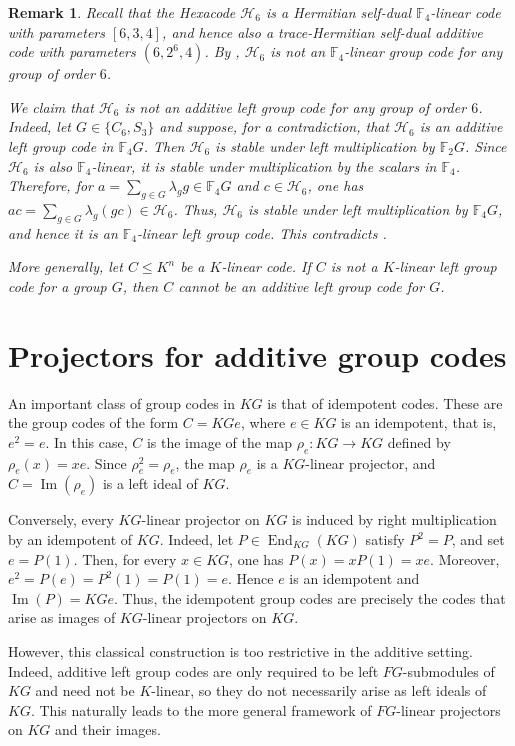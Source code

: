 \documentclass[11pt]{article}
\newtheorem{remark}[theorem]{Remark}
\begin{document}
\begin{remark}\label{hexa-code}
Recall that the Hexacode $\mathcal{H}_6$ is a Hermitian self-dual
$\mathbb{F}_4$-linear code with parameters $[6,3,4]$, and hence also a
trace-Hermitian self-dual additive code with parameters $(6,2^6,4)$. By
\cite{BBW24}, $\mathcal{H}_6$ is not an $\mathbb{F}_4$-linear group code for
any group of order $6$.

We claim that $\mathcal{H}_6$ is not an additive left group code for any
group of order $6$. Indeed, let $G\in\{C_6,S_3\}$ and suppose, for a
contradiction, that $\mathcal{H}_6$ is an additive left group code in
$\mathbb{F}_4G$. Then $\mathcal{H}_6$ is stable under left multiplication by
$\mathbb{F}_2G$. Since $\mathcal{H}_6$ is also $\mathbb{F}_4$-linear, it is
stable under multiplication by the scalars in $\mathbb{F}_4$. Therefore, for
$a=\sum_{g\in G}\lambda_g g\in\mathbb{F}_4G$ and
$c\in\mathcal{H}_6$, one has
$ac=\sum_{g\in G}\lambda_g(gc)\in\mathcal{H}_6$. Thus,
$\mathcal{H}_6$ is stable under left multiplication by $\mathbb{F}_4G$, and
hence it is an $\mathbb{F}_4$-linear left group code. This contradicts
\cite{BBW24}.

More generally, let $C\leq K^n$ be a $K$-linear code. If $C$ is not a
$K$-linear left group code for a group $G$, then $C$ cannot be an additive
left group code for $G$.
\end{remark}
\section{Projectors for additive group codes}
An important class of group codes in $KG$ is that of idempotent codes. These
are the group codes of the form $C=KGe$, where $e\in KG$ is an idempotent,
that is, $e^2=e$. In this case, $C$ is the image of the map
$\rho_e:KG\longrightarrow KG$ defined by $\rho_e(x)=xe$. Since
$\rho_e^2=\rho_e$, the map $\rho_e$ is a $KG$-linear projector, and
$C=\operatorname{Im}(\rho_e)$ is a left ideal of $KG$.

Conversely, every $KG$-linear projector on $KG$ is induced by right
multiplication by an idempotent of $KG$. Indeed, let
$P\in\operatorname{End}_{KG}(KG)$ satisfy $P^2=P$, and set $e=P(1)$. Then,
for every $x\in KG$, one has $P(x)=xP(1)=xe$. Moreover,
$e^2=P(e)=P^2(1)=P(1)=e$. Hence $e$ is an idempotent and
$\operatorname{Im}(P)=KGe$. Thus, the idempotent group codes are precisely
the codes that arise as images of $KG$-linear projectors on $KG$.

However, this classical construction is too restrictive in the additive
setting. Indeed, additive left group codes are only required to be left
$FG$-submodules of $KG$ and need not be $K$-linear, so they do not
necessarily arise as left ideals of $KG$. This naturally leads to the more
general framework of $FG$-linear projectors on $KG$ and their images.
\end{document}
